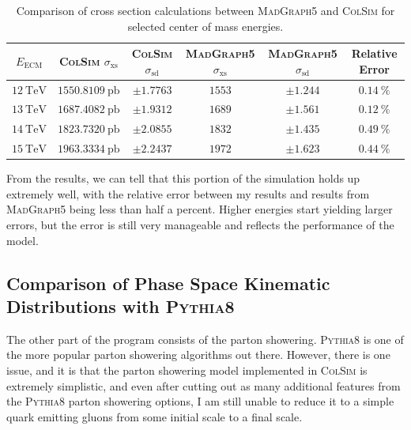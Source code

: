 \begin{table}[h]
  \centering
  \begin{tabular}{|c|c|c|c|c|c|}
    \hline
    $E_{\mathrm{ECM}}$ & \textsc{ColSim} $\sigma_{\mathrm{xs}}$ & \textsc{ColSim} $\sigma_{\mathrm{sd}}$ & \textsc{MadGraph5} $\sigma_{\mathrm{xs}}$ & \textsc{MadGraph5} $\sigma_{\mathrm{sd}}$ & Relative Error \\ \hline
    $\qty{12}{\tera\electronvolt}$ & $\qty{1550.8109}{\pico\barn}$ & $\pm 1.7763$ & $1553$ & $\pm 1.244$ & $\qty{0.14}{\percent}$ \\ \hline
    $\qty{13}{\tera\electronvolt}$ & $\qty{1687.4082}{\pico\barn}$ & $\pm 1.9312$ & $1689$ & $\pm 1.561$ & $\qty{0.12}{\percent}$ \\ \hline
    $\qty{14}{\tera\electronvolt}$ & $\qty{1823.7320}{\pico\barn}$ & $\pm 2.0855$ & $1832$ & $\pm 1.435$ & $\qty{0.49}{\percent}$ \\ \hline
    $\qty{15}{\tera\electronvolt}$ & $\qty{1963.3334}{\pico\barn}$ & $\pm 2.2437$ & $1972$ & $\pm 1.623$ & $\qty{0.44}{\percent}$ \\ \hline
  \end{tabular}
  \caption{Comparison of cross section calculations between \textsc{MadGraph5} and \textsc{ColSim} for selected center of mass energies.}
  \label{tbl:cross-section-comparison}
\end{table}

From the results, we can tell that this portion of the simulation holds up extremely well, with the relative error between my results and results from \textsc{MadGraph5} being less than half a percent. Higher energies start yielding larger errors, but the error is still very manageable and reflects the performance of the model.


\subsection{Comparison of Phase Space Kinematic Distributions with \texorpdfstring{\textsc{Pythia8}}{Pythia8}}

The other part of the program consists of the parton showering. \textsc{Pythia8} is one of the more popular parton showering algorithms out there. However, there is one issue, and it is that the parton showering model implemented in \textsc{ColSim} is extremely simplistic, and even after cutting out as many additional features from the \textsc{Pythia8} parton showering options, I am still unable to reduce it to a simple quark emitting gluons from some initial scale to a final scale.

